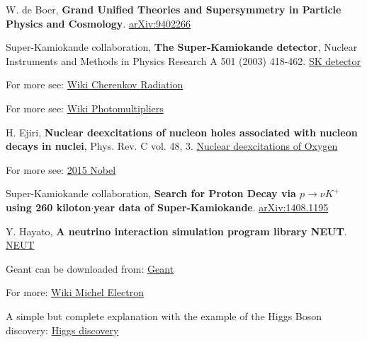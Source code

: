 \begin{thebibliography}{9}

  W. de Boer,
  \textbf{Grand Unified Theories
	and Supersymmetry in
	Particle Physics and Cosmology}.
  \href{https://arxiv.org/pdf/hep-ph/9402266.pdf}{arXiv:9402266}

  Super-Kamiokande collaboration,
  \textbf{The Super-Kamiokande detector},
  Nuclear Instruments and Methods in Physics Research A 501 (2003) 418-462. 
  \href{http://www-sk.icrr.u-tokyo.ac.jp/~masato_s/class/sk-detector.pdf}{SK detector}
  
  For more see: 
  \href{https://en.wikipedia.org/wiki/Cherenkov_radiation}{Wiki Cherenkov Radiation}

  For more see: 
  \href{https://en.wikipedia.org/wiki/Photomultiplier}{Wiki Photomultipliers}
  
  H. Ejiri,
  \textbf{Nuclear deexcitations of nucleon holes associated with nucleon decays in nuclei},
  Phys. Rev. C vol. 48,  3.
  \href{https://journals.aps.org/prc/pdf/10.1103/PhysRevC.48.1442}{Nuclear deexcitations of Oxygen}
    
  For more see: 
  \href{http://www.nobelprize.org/nobel_prizes/physics/laureates/2015/}{2015 Nobel}
  
  Super-Kamiokande collaboration,
  \textbf{Search for Proton Decay via $p\rightarrow \nu K^{+}$ using 260 kiloton$\cdot$year data of Super-Kamiokande}.
  \href{https://arxiv.org/pdf/1408.1195v1.pdf}{arXiv:1408.1195}
  
  Y. Hayato,
   \textbf{A neutrino interaction simulation program library NEUT}.
  \href{http://inspirehep.net/record/844435/files/v40p2477.pdf?version=1}{NEUT}
  
  Geant can be downloaded from: 
  \href{https://root.cern.ch/installing-geant3}{Geant}
  
  For more:
  \href{https://en.wikipedia.org/wiki/Michel_parameters}{Wiki Michel Electron}
  
  A simple but complete explanation with the example of the Higgs Boson discovery:
  \href{https://blogs.scientificamerican.com/observations/five-sigmawhats-that/}{Higgs discovery}
  
\end{thebibliography}


